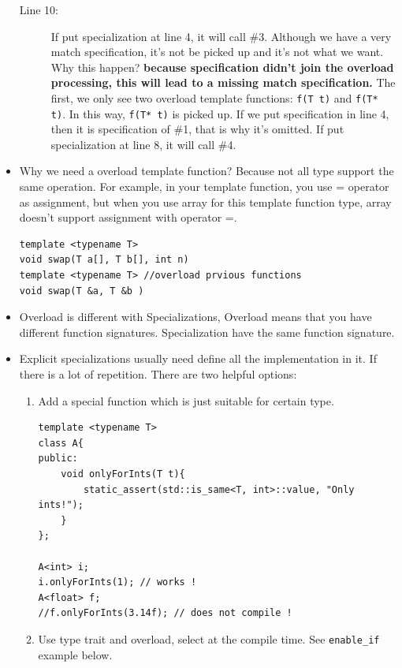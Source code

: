 \documentclass[a4paper,11pt,twoside]{book}
\begin{document}
\begin{itemize}
\begin{description}
	\item[Line 10:] If put specialization at line 4, it will call \#3. Although we have a very match specification, it's not be picked up and it's not what we want.  Why this happen? \textbf{because specification didn't join the overload processing, this will lead to a missing match specification.} The first, we only see two overload template functions: \texttt{f(T t)} and \texttt{f(T* t)}. In this way, \texttt{f(T* t)} is picked up. If we put specification in line 4, then it is specification of \#1, that is why it's omitted. If put specialization at line 8, it will call \#4.	
\end{description}

	\item Why we need a overload template function? Because not all type support the same operation. For example, in your template function, you use = operator as assignment, but when you use array for this template function type, array doesn't support assignment with operator =.
\begin{lstlisting}[numbers=none]
template <typename T>
void swap(T a[], T b[], int n)
template <typename T> //overload prvious functions
void swap(T &a, T &b )
\end{lstlisting}

	\item Overload is different with Specializations, Overload means that you have different function signatures. Specialization have the same function signature.

	\item Explicit specializations usually need define all the implementation in it. If there is a lot of repetition. There are two helpful options: 
\begin{enumerate}
	\item Add a special function which is just suitable for certain type. 
\begin{lstlisting}[numbers=none]
template <typename T>
class A{
public:
	void onlyForInts(T t){
		static_assert(std::is_same<T, int>::value, "Only ints!");
	}
};

A<int> i;
i.onlyForInts(1); // works !
A<float> f;
//f.onlyForInts(3.14f); // does not compile !
\end{lstlisting}

	\item Use type trait and overload, select at the compile time. See \texttt{enable\_if} example below.
\end{enumerate}


\end{itemize}
\end{document}
